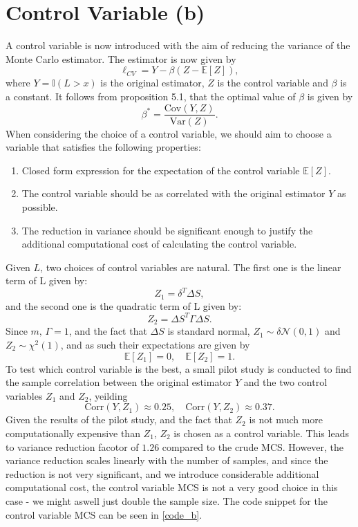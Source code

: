 \documentclass{article}
\begin{document}
\section{Control Variable (b)}
A control variable is now introduced with the aim of reducing the variance of the Monte Carlo estimator. The estimator is now given by
\begin{equation}
    \ell_{CV} = Y - \beta(Z - \mathbb{E}[Z]),
\end{equation}
where $Y = \mathbb{I}(L > x)$ is the original estimator, $Z$ is the control variable and $\beta$ is a constant. It follows from proposition 5.1, that the optimal value of $\beta$ is given by
\begin{equation*}
    \beta^* = \frac{\text{Cov}(Y, Z)}{\text{Var}(Z)}.
\end{equation*}
When considering the choice of a control variable, we should aim to choose a variable that satisfies the following properties:
\begin{enumerate}
    \item Closed form expression for the expectation of the control variable $\mathbb{E}[Z]$.
    \item The control variable should be as correlated with the original estimator $Y$ as possible.
    \item The reduction in variance should be significant enough to justify the additional computational cost of calculating the control variable.
\end{enumerate}
Given $L$, two choices of control variables are natural. The first one is the linear term of L given by:
\begin{equation*}
    Z_1 = \delta^T\Delta S, 
\end{equation*}
and the second one is the quadratic term of L given by:
\begin{equation*}
    Z_2 = \Delta S^T\Gamma\Delta S.
\end{equation*}
Since $m, \, \Gamma = 1$, and the fact that $\Delta S$ is standard normal, $Z_1 \sim \delta\mathcal{N}(0, 1)$ and $Z_2 \sim \chi^2(1)$, and as such their expectations are given by
\begin{equation*}
    \mathbb{E}[Z_1] = 0, \quad \mathbb{E}[Z_2] = 1.
\end{equation*}
To test which control variable is the best, a small pilot study is conducted to find the sample correlation between the original estimator $Y$ and the two control variables $Z_1$ and $Z_2$, yeilding
\begin{equation*}
    \text{Corr}(Y, Z_1) \approx 0.25, \quad \text{Corr}(Y, Z_2) \approx 0.37.
\end{equation*}
Given the results of the pilot study, and the fact that $Z_2$ is not much more computationally expensive than $Z_1$, $Z_2$ is chosen as a control variable. This leads to variance reduction facotor of $1.26$ compared to the crude MCS. However, the variance reduction scales linearly with the number of samples, and since the reduction is not very significant, and we introduce considerable additional computational cost, the control variable MCS is not a very good choice in this case - we might aswell just double the sample size. The code snippet for the control variable MCS can be seen in \autoref{code_b}.
\end{document}
